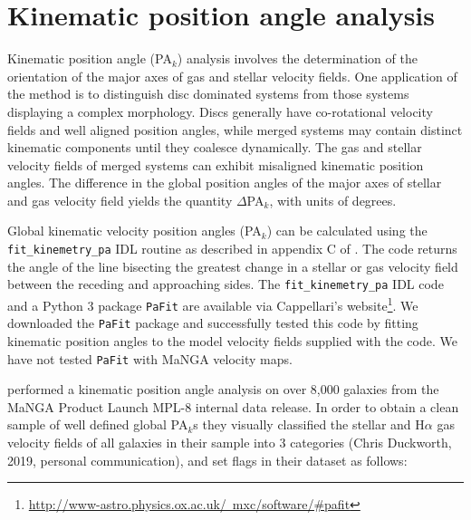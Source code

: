 \section{Kinematic position angle analysis}
\label{sec:methods-I-kinemetry}

Kinematic position angle (PA$_{k}$) analysis involves the determination of the orientation of the major axes of gas and stellar velocity fields. One application of the method is to distinguish disc dominated systems from those systems displaying a complex morphology. Discs generally have co-rotational velocity fields and well aligned position angles, while merged systems may contain distinct kinematic components until they coalesce dynamically. The gas and stellar velocity fields of merged systems can exhibit misaligned kinematic position angles. The difference in the global position angles of the major axes of stellar and gas velocity field yields the quantity $\Delta$PA$_{k}$, with units of degrees.

\label{sec:kinemetry-analysis-method-description}
Global kinematic velocity position angles (PA$_{k}$) can be calculated using the \texttt{fit\_kinemetry\_pa} IDL routine as described in appendix C of \cite{2006MNRAS.366..787K}. The code returns the angle of the line bisecting the greatest change in a stellar or gas velocity field between the receding and approaching sides. The \texttt{fit\_kinemetry\_pa} IDL code and a Python 3 package \texttt{PaFit} are available via Cappellari's website\footnote{\href{http://www-astro.physics.ox.ac.uk/~mxc/software/\#pafit}{http://www-astro.physics.ox.ac.uk/~mxc/software/\#pafit}}. We downloaded the \texttt{PaFit} package and successfully tested this code by fitting kinematic position angles to the model velocity fields supplied with the code. We have not tested \texttt{PaFit} with MaNGA velocity maps.

\cite{2019MNRAS.483..172D} performed a kinematic position angle analysis on over 8,000 galaxies from the MaNGA Product Launch MPL-8 internal data release. In order to obtain a clean sample of well defined global PA$_{k}$s they visually classified the stellar and H$\alpha$ gas velocity fields of all galaxies in their sample into 3 categories (Chris Duckworth, 2019, personal communication), and set flags in their dataset as follows:

